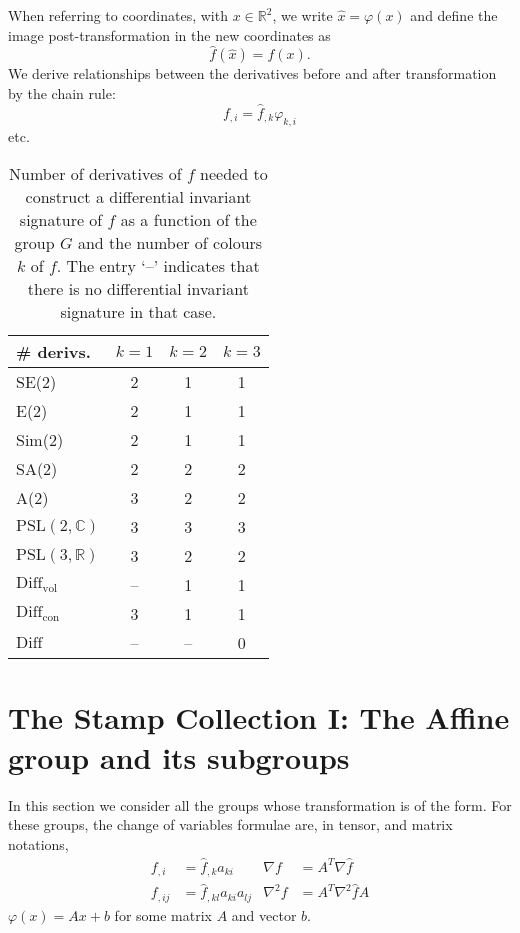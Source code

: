 \documentclass{article}
\def\R{\mathbb{R}}
\begin{document}
When referring to coordinates, with $x \in \mathbb{R}^2$, we write $\hat{x}
= \varphi(x)$  and define the image post-transformation in the new
coordinates as
\begin{equation}
  \hat{f}(\hat{x}) = f(x).
\end{equation}
We derive relationships between the derivatives before and after
transformation by the chain rule:
\begin{equation*}
  f_{, i} = \hat{f}_{,k} \varphi_{k, i} 
\end{equation*}
etc. 


\begin{table}[h]
\begin{center}
\begin{tabular}{| l | c c c |}
\hline
\# derivs. & $k=1$ & $k=2$ & $k=3$ \\
\hline
SE(2) & 2 &1 & 1 \\
E(2) & 2 & 1 & 1 \\
Sim(2) & 2 & 1 & 1 \\
SA(2) & 2 & 2 & 2 \\
A(2) & 3 & 2 & 2 \\
$\mathrm{PSL}(2,\mathbb{C})$ & 3 & 3 & 3 \\
$\mathrm{PSL}(3,\R)$ & 3 & 2 & 2 \\
$\mathrm{Diff}_{\mathrm{vol}}$ & -- & 1 & 1 \\
$\mathrm{Diff}_{\mathrm{con}}$ & 3 & 1 & 1 \\
$\mathrm{Diff}$ & -- & -- & 0 \\
\hline
\end{tabular}
\caption{Number of derivatives of $f$ needed to construct a differential invariant signature of $f$ as a function of the group $G$ and the number of colours $k$ of $f$. The entry `--' indicates that there is no differential invariant signature in that case.}
\end{center}
\end{table}


\section{The Stamp Collection I: The Affine group and its subgroups}
In this section we consider all the groups whose transformation is of the
form. For these groups, the change of variables formulae are, in tensor,
and matrix notations,
\begin{align}
  f_{,i} &= \hat{f}_{, k} a_{ki} & \nabla f &= A^T \nabla \hat{f} \\
  f_{,ij} &= \hat{f}_{, kl} a_{ki} a_{lj} & 
  \nabla^2 f &= A^T \nabla^2 \hat{f} A
\end{align}
$\varphi(x) = Ax + b$ for some matrix $A$ and vector $b$.
\end{document}
